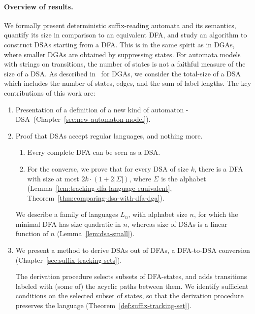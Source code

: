 \paragraph*{Overview of results.}
We formally present deterministic suffix-reading automata and its
semantics, quantify its size in comparison to an equivalent DFA, and
study an algorithm to construct DSAs starting from a DFA. This is in
the same spirit as in DGAs, where smaller DGAs are obtained by suppressing
states. For automata models with strings on transitions, the number of
states is not a faithful measure of the size of a DSA. As described
in~\cite{giammarresi1999deterministic} for DGAs, we consider the total-size of
a DSA which includes the number of states, edges, and the sum of label
lengths. The key contributions of this work are:
\begin{enumerate}
\item Presentation of a definition of a new kind of automaton - DSA~(Chapter~\ref{sec:new-automaton-model}).

\item Proof that DSAs accept regular languages, and nothing more.
\begin{enumerate}
  \item Every complete DFA can be seen as a DSA. 
  \item For the converse, we prove
  that for every DSA of size $k$, there is a DFA with size at most
  $2k \cdot (1 + 2 |\Sigma|)$, where $\Sigma$ is the alphabet
  (Lemma~\ref{lem:tracking-dfa-language-equivalent},
  Theorem~\ref{thm:comparing-dsa-with-dfa-dga}).
\end{enumerate}  
  We describe a family of languages $L_n$, with alphabet size $n$, for
  which the minimal DFA has size quadratic in $n$, whereas size of
  DSAs is a linear function of $n$ (Lemma~\ref{lem:dsa-small}).

\item We present a method to derive DSAs out of DFAs, a DFA-to-DSA
  conversion (Chapter~\ref{sec:suffix-tracking-sets}). 
  
  The derivation procedure selects subsets of DFA-states, and adds
  transitions labeled with (some of) the acyclic paths between
  them. We identify sufficient conditions on
  the selected subset of states, so that the derivation procedure
  preserves the language (Theorem~\ref{def:suffix-tracking-set}).


\end{enumerate}
